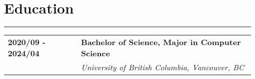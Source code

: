\documentclass[letterpaper]{article}
\newcommand{\horizontalLine}{%
    {\color{cyan}
    \rule{\textwidth}{1pt}
    \vspace{-1ex}}
}
\begin{document}
    \section*{Education}

        \horizontalLine

        \begin{tabular}{p{} p{}} 
            \textbf{2020/09 - 2024/04} & \large\textbf{Bachelor of Science, Major in Computer Science} \\
            & \emph{University of British Columbia, Vancouver, BC} \\
        \end{tabular}
\end{document}
